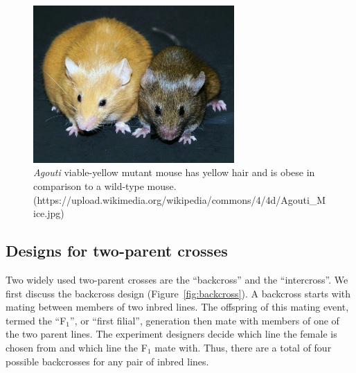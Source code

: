 \documentclass[]{article}\usepackage[]{graphicx}\usepackage[]{color}
\begin{document}
\begin{figure}
\includegraphics[height=6cm]{figs/Agouti.jpg}
\caption{\emph{Agouti} viable-yellow mutant mouse has yellow hair and is obese in comparison to a wild-type mouse. \tiny{(https://upload.wikimedia.org/wikipedia/commons/4/4d/Agouti\_Mice.jpg)}}
\label{fig:agouti}
\end{figure}












































\subsection{Designs for two-parent crosses}

Two widely used two-parent crosses are the ``backcross'' and the ``intercross''. We first discuss the backcross design (Figure~\ref{fig:backcross}). A backcross starts with mating between members of two inbred lines. The offspring of this mating event, termed the ``F$_1$'', or ``first filial'', generation then mate with members of one of the two parent lines. The experiment designers decide which line the female is chosen from and which line the F$_1$ mate with. Thus, there are a total of four possible backcrosses for any pair of inbred lines. 
\end{document}

